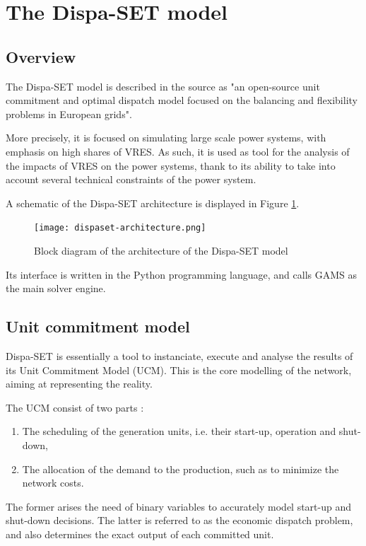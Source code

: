 \section{The Dispa-SET model}

\subsection{Overview}

The Dispa-SET model \cite{dispaset} is described in the source \cite{dispaset2} as "an open-source unit commitment and optimal dispatch model focused on the balancing and flexibility problems in European grids".

More precisely, it is focused on simulating large scale power systems, with emphasis on high shares of VRES. As such, it is used as tool for the analysis of the impacts of VRES on the power systems, thank to its ability to take into account several technical constraints of the power system.

A schematic of the Dispa-SET architecture is displayed in Figure \ref{dispaset-architecture}.

\begin{figure}[h]
    \texttt{[image: dispaset-architecture.png]}
    \caption{Block diagram of the architecture of the Dispa-SET model}
    \label{dispaset-architecture}
\end{figure}

Its interface is written in the Python programming language, and calls GAMS \cite{GAMS} as the main solver engine.

\subsection{Unit commitment model}

Dispa-SET is essentially a tool to instanciate, execute and analyse the results of its Unit Commitment Model (UCM). This is the core modelling of the network, aiming at representing the reality.

The UCM consist of two parts \cite{dispaset2}:
\begin{enumerate}
    \item The scheduling of the generation units, i.e. their start-up, operation and shut-down,
    \item The allocation of the demand to the production, such as to minimize the network costs.
\end{enumerate}

The former arises the need of binary variables to accurately model start-up and shut-down decisions. The latter is referred to as the economic dispatch problem, and also determines the exact output of each committed unit.


